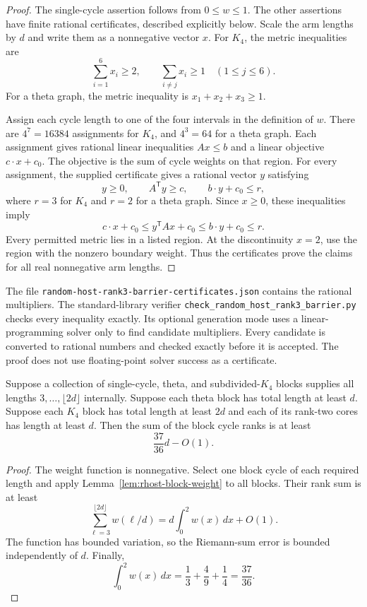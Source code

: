 \begin{proof}
The single-cycle assertion follows from $0\le w\le1$.
The other assertions have finite rational certificates, described explicitly below.
Scale the arm lengths by $d$ and write them as a nonnegative vector $x$.
For $K_4$, the metric inequalities are
\[
 \sum_{i=1}^6x_i\ge2,\qquad
 \sum_{i\ne j}x_i\ge1\quad(1\le j\le6).
\]
For a theta graph, the metric inequality is $x_1+x_2+x_3\ge1$.

Assign each cycle length to one of the four intervals in the definition of $w$.
There are $4^7=16384$ assignments for $K_4$, and $4^3=64$ for a theta graph.
Each assignment gives rational linear inequalities $Ax\le b$ and a linear objective $c\cdot x+c_0$.
The objective is the sum of cycle weights on that region.
For every assignment, the supplied certificate gives a rational vector $y$ satisfying
\[
 y\ge0,\qquad A^{\mathsf T}y\ge c,\qquad
 b\cdot y+c_0\le r,
\]
where $r=3$ for $K_4$ and $r=2$ for a theta graph.
Since $x\ge0$, these inequalities imply
\[
 c\cdot x+c_0\le y^{\mathsf T}Ax+c_0\le b\cdot y+c_0\le r.
\]
Every permitted metric lies in a listed region.
At the discontinuity $x=2$, use the region with the nonzero boundary weight.
Thus the certificates prove the claims for all real nonnegative arm lengths.
\end{proof}

The file \nolinkurl{random-host-rank3-barrier-certificates.json} contains the rational multipliers.
The standard-library verifier \nolinkurl{check_random_host_rank3_barrier.py} checks every inequality exactly.
Its optional generation mode uses a linear-programming solver only to find candidate multipliers.
Every candidate is converted to rational numbers and checked exactly before it is accepted.
The proof does not use floating-point solver success as a certificate.

\begin{proposition}[A barrier of $37/36$]\label{prop:rhost-block-barrier}
Suppose a collection of single-cycle, theta, and subdivided-$K_4$ blocks supplies all lengths $3,\ldots,\lfloor2d\rfloor$ internally.
Suppose each theta block has total length at least $d$.
Suppose each $K_4$ block has total length at least $2d$ and each of its rank-two cores has length at least $d$.
Then the sum of the block cycle ranks is at least
\[
 \frac{37}{36}d-O(1).
\]
\end{proposition}

\begin{proof}
The weight function is nonnegative.
Select one block cycle of each required length and apply Lemma~\ref{lem:rhost-block-weight} to all blocks.
Their rank sum is at least
\[
 \sum_{\ell=3}^{\lfloor2d\rfloor}w(\ell/d)
 =d\int_0^2w(x)\,dx+O(1).
\]
The function has bounded variation, so the Riemann-sum error is bounded independently of $d$.
Finally,
\[
 \int_0^2w(x)\,dx
 =\frac13+\frac49+\frac14=\frac{37}{36}.
\]
\end{proof}


